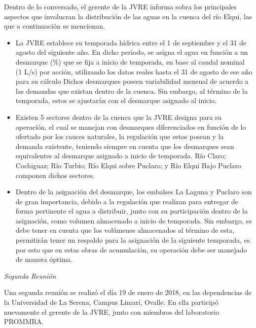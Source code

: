 \documentclass[11pt,]{article}
\begin{document}
		Dentro de lo conversado, el gerente de la JVRE informa sobra los principales aspectos que involucran la distribución de las aguas en la cuenca del río Elqui, las que a continuación se mencionan.
		
		\begin{itemize}
		
		\item La JVRE establece su temporada hídrica entre el 1 de septiembre y el 31 de agosto del siguiente año. En dicho periodo, se asigna el agua en función a un desmarque (\%) que se fija a inicio de temporada, en base al caudal nominal (1 L/s) por acción, utilizando los datos reales hasta el 31 de agosto de ese año para su cálculo Dichos desmarques poseen variabilidad mensual de acuerdo a las demandas que existan dentro de la cuenca. Sin embargo, al término de la temporada, estos se ajustarán con el desmarque asignado al inicio.
		
		\item Existen 5 sectores dentro de la cuenca que la JVRE designa para su operación, el cual se manejan con desmarques diferenciados en función de lo ofertado por los cauces naturales, la regulación que estos posean y la demanda existente, teniendo siempre en cuenta que los desmarques sean equivalentes al desmarque asignado a inicio de temporada. Río Claro; Cochiguaz; Río Turbio; Río Elqui sobre Puclaro; y Río Elqui Bajo Puclaro componen dichos sectores.
		
		\item Dentro de la asignación del desmarque, los embalses La Laguna y Puclaro son de gran importancia, debido a la regulación que realizan para entregar de forma pertinente el agua a distribuir, junto con su participación dentro de la asignación, como volumen almacenado a inicio de temporada. Sin embargo, se debe tener en cuenta que los volúmenes almacenados al término de esta, permitirán tener un respaldo para la asignación de la siguiente temporada, es por esto que en estas obras de acumulación, su operación debe ser manejado de manera óptima.
		
		
		\end{itemize}		\bigskip
		
		\textit {Segunda Reunión}\bigskip
		
		Una segunda reunión se realizó el día 19 de enero de 2018, en las dependencias de la Universidad de La Serena, Campus Limarí, Ovalle. En ella participó nuevamente el gerente de la JVRE, junto con miembros del laboratorio PROMMRA. \bigskip
		
\end{document}
